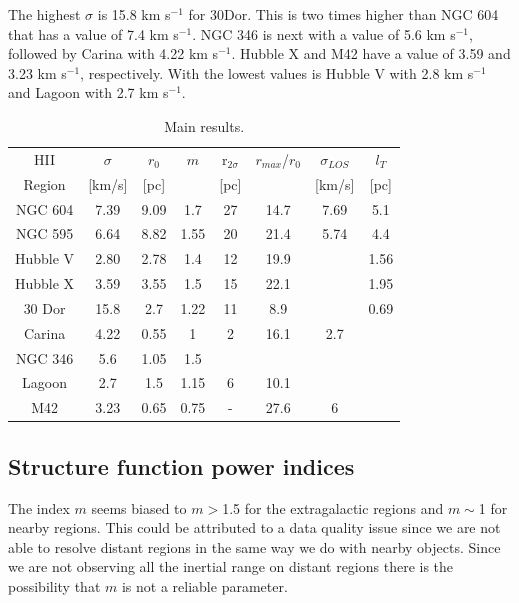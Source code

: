 \documentclass[fleqn,usenatbib, useAMS, a4paper]{mnras}
\begin{document}
The highest \(\sigma\) is 15.8 km s\(^{-1}\) for 30Dor.
This is two times higher than NGC 604 that has a value of 7.4 km s\(^{-1}\).
NGC 346 is next with a value of 5.6 km s\(^{-1}\), followed by Carina with 4.22 km s\(^{-1}\).
Hubble X and M42 have a value of 3.59 and 3.23 km s\(^{-1}\), respectively.
With the lowest values is Hubble V with 2.8 km s\(^{-1}\) and Lagoon with 2.7 km s\(^{-1}\).
    

\begin{table}
\begin{center}\caption{Main results.}
\begin{tabular}{cccccccc}\hline
HII    &  \(\sigma\) &   \(r_0\) &    \(m\)   & r$_{2\sigma}$ &  \(r_{max}\)/\(r_0\) & \(\sigma_{LOS}\)& \(l_T\) \\
    Region    &  [km/s]  &   [pc]    &       & [pc] &  &[km/s]&    [pc] \\\hline
NGC 604   &  7.39    &   9.09    &   1.7  & 27  & 14.7 &  7.69&  5.1 \\
NGC 595   &  6.64    &   8.82    &   1.55 & 20  & 21.4 & 5.74& 4.4 \\
Hubble V  &  2.80    &   2.78    &   1.4  &  12  & 19.9 & & 1.56 \\ 
Hubble X  &  3.59    &   3.55    &   1.5  &  15  & 22.1 & & 1.95 \\       
30 Dor    &  15.8    &   2.7     &   1.22 &  11  & 8.9 &  & 0.69 \\  
Carina    &  4.22    &   0.55    &    1   &   2   &  16.1  &  2.7&  \\
NGC 346   &   5.6    &  1.05     &    1.5    &      &  & & \\
Lagoon    &  2.7     &   1.5     &   1.15 &   6   & 10.1 &&     \\  
M42       &  3.23    &   0.65    &   0.75 &  -   & 27.6 & 6	& \\	  

\end{tabular}\label{tab:Res}
\end{center}
\end{table}

\subsection{Structure function power indices}

The index \(m\) seems biased to \(m>\)1.5 for the extragalactic regions and \(m\sim\)1 for nearby regions.
This could be attributed to a data quality issue since we are not able to resolve distant regions in the same way we do with nearby objects.
Since we are not observing all the inertial range on distant regions there is the possibility that \(m\) is not a reliable parameter.
\end{document}

